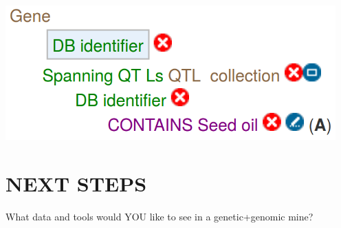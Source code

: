 \documentclass[]{pagposter}
\begin{document}
\begin{multicols*}{3}
\begin{center}
{    }
    \vspace{24pt}
    \includegraphics[width=5in]{gene-seed-oil-query.png} %
  \end{center}


  \section*{NEXT STEPS}

  What data and tools would YOU like to see in a genetic+genomic mine?





  \nocite{*} %


\end{multicols*}
\end{document}
